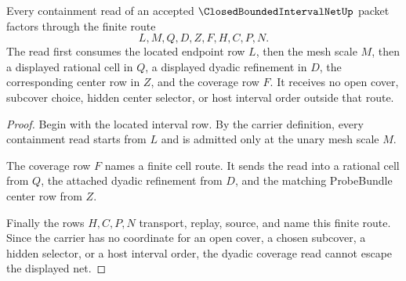 \begin{theorem}
\label{thm:closed-bounded-interval-net-dyadic-coverage}
Every containment read of an accepted $\ClosedBoundedIntervalNetUp$ packet factors through the finite route
$$
L,M,Q,D,Z,F,H,C,P,N.
$$
The read first consumes the located endpoint row $L$, then the mesh scale $M$, then a displayed rational cell in $Q$, a displayed dyadic refinement in $D$, the corresponding center row in $Z$, and the coverage row $F$. It receives no open cover, subcover choice, hidden center selector, or host interval order outside that route.
\end{theorem}
\begin{proof}
Begin with the located interval row. By the carrier definition, every containment read starts from $L$ and is admitted only at the unary mesh scale $M$.

The coverage row $F$ names a finite cell route. It sends the read into a rational cell from $Q$, the attached dyadic refinement from $D$, and the matching ProbeBundle center row from $Z$.

Finally the rows $H,C,P,N$ transport, replay, source, and name this finite route. Since the carrier has no coordinate for an open cover, a chosen subcover, a hidden selector, or a host interval order, the dyadic coverage read cannot escape the displayed net.
\end{proof}

